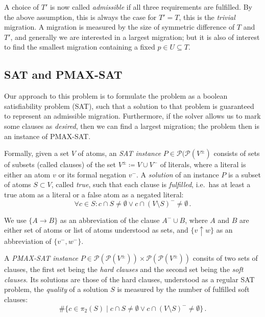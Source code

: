 \documentclass[halfparskip,11pt]{scrartcl}
\begin{document}

A choice of $T'$ is now called \emph{admissible} if all three requirements are fulfilled. By the above assumption, this is always the case for $T'=T$, this is the \emph{trivial} migration. A migration is measured by the size of symmetric difference of $T$ and $T'$, and generally we are interested in a largest migration; but it is also of interest to find the smallest migration containing a fixed $p\in U\subseteq T$.

\subsection{SAT and PMAX-SAT}
\label{sec:sat}

Our approach to this problem is to formulate the problem as a boolean satisfiability problem (SAT), such that a solution to that problem is guaranteed to represent an admissible migration. Furthermore, if the solver allows us to mark some clauses as \emph{desired}, then we can find a largest migration; the problem then is an instance of PMAX-SAT.

Formally, given a set $V$ of atoms, an \emph{SAT instance} $P\in \mathcal P(\mathcal P(V^\pm)$ consists of sets of subsets (called clauses) of the set $V^\pm \coloneqq V \cup V^-$ of literals, where a literal is either an atom $v$ or its formal negation $v^-$. A \emph{solution} of an instance $P$ is a subset of atoms $S\subset V$, called \emph{true}, such that each clause is \emph{fulfilled}, i.e.\ has at least a true atom as a literal or a false atom as a negated literal:
\[
\forall c\in S\colon c\cap S \ne \emptyset \vee c \cap (V\setminus S)^- \ne \emptyset\,.
\]

We use $\{A \to B\}$ as an abbreviation of the clause $A^- \cup B$, where $A$ and $B$ are either set of atoms or list of atoms understood as sets, and $\{v\uparrow w\}$ as an abbreviation of $\{v^-,w^-\}$.

A \emph{PMAX-SAT instance} $P\in \mathcal P(\mathcal P(V^\pm))\times \mathcal P(\mathcal P(V^\pm))$ consits of two sets of clauses, the first set being the \emph{hard clauses} and the second set being the \emph{soft clauses}. Its solutions are those of the hard clauses, understood as a regular SAT problem, the \emph{quality} of a solution $S$ is measured by the number of fulfilled soft clauses:
\[
\#\{c\in \pi_2(S) \mid c\cap S \ne \emptyset \vee c \cap (V\setminus S)^- \ne \emptyset\}\,.
\]
\end{document}
